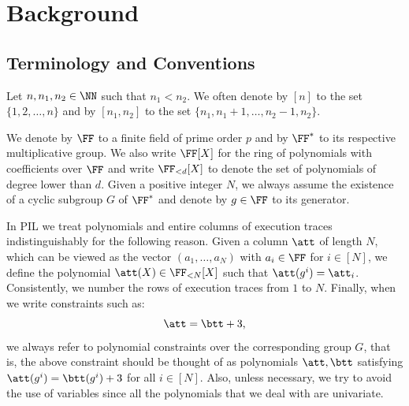

\section{Background}

\subsection{Terminology and Conventions}

Let $n,n_1,n_2 \in \NN$ such that $n_1 < n_2$. We often denote by $[n]$ to the set $\{1,2,\dots, n\}$ and by $[n_1,n_2]$ to the set $\{n_1, n_1+1, \dots, n_2 - 1, n_2\}$.

We denote by $\FF$ to a finite field of prime order $p$ and by $\FF^*$ to its respective multiplicative group. We also write $\FF[X]$ for the ring of polynomials with coefficients over $\FF$ and write $\FF_{<d}[X]$ to denote the set of polynomials of degree lower than $d$. Given a positive integer $N$, we always assume the existence of a cyclic subgroup $G$ of $\FF^*$ and denote by $g \in \FF$ to its generator.

In PIL we treat polynomials and entire columns of execution traces indistinguishably for the following reason. Given a column $\att$ of length $N$, which can be viewed as the vector $(a_1,\dots,a_N)$ with $a_i \in \FF$ for $i \in [N]$, we define the polynomial $\att(X) \in \FF_{<N}[X]$ such that $\att(g^i) = \att_i$. Consistently, we number the rows of execution traces from $1$ to $N$. Finally, when we write constraints such as:
\[
\att = \btt + 3,  
\]
we always refer to polynomial constraints over the corresponding group $G$, that is, the above constraint should be thought of as polynomials $\att,\btt$ satisfying $\att(g^i) = \btt(g^i) + 3$ for all $i \in [N]$. Also, unless necessary, we try to avoid the use of variables since all the polynomials that we deal with are univariate. 



